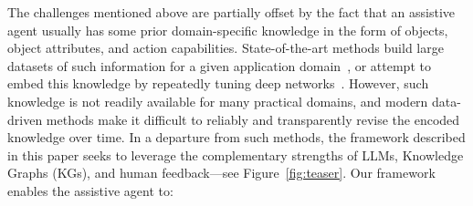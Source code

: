 \vspace{-0.75em}
The challenges mentioned above are partially offset by the fact that an assistive agent usually has some prior domain-specific knowledge in the form of objects, object attributes, and action capabilities. State-of-the-art methods build large datasets of such information for a given application domain~\cite{sakib2022approximate}, or attempt to embed this knowledge by repeatedly tuning deep networks~\cite{sakib2024cooking}. However, such knowledge is not readily available for many practical domains, and modern data-driven methods make it difficult to reliably and transparently revise the encoded knowledge over time. In a departure from such methods, the framework described in this paper seeks to leverage the complementary strengths of LLMs, Knowledge Graphs (KGs), and human feedback---see Figure~\ref{fig:teaser}. Our framework enables the assistive agent to:

